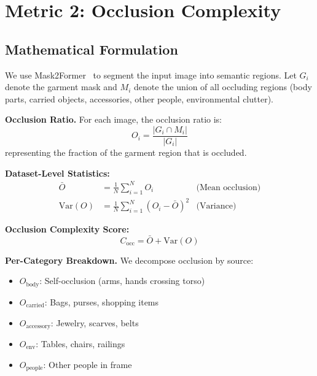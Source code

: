\documentclass[runningheads]{llncs}
\newcommand{\Var}{\mathrm{Var}}
\begin{document}
\section{Metric 2: Occlusion Complexity}
\label{sec:m2_occlusion}

\subsection{Mathematical Formulation}

We use Mask2Former~\cite{cheng2022mask2former} to segment the input image into semantic regions. Let $G_i$ denote the garment mask and $M_i$ denote the union of all occluding regions (body parts, carried objects, accessories, other people, environmental clutter).

\textbf{Occlusion Ratio.} For each image, the occlusion ratio is:
\begin{equation}
    O_i = \frac{|G_i \cap M_i|}{|G_i|}
\end{equation}
representing the fraction of the garment region that is occluded.

\textbf{Dataset-Level Statistics:}
\begin{align}
    \bar{O} &= \frac{1}{N}\sum_{i=1}^{N} O_i & \text{(Mean occlusion)} \\
    \Var(O) &= \frac{1}{N}\sum_{i=1}^{N} (O_i - \bar{O})^2 & \text{(Variance)}
\end{align}

\textbf{Occlusion Complexity Score:}
\begin{equation}
    C_{\text{occ}} = \bar{O} + \Var(O)
\end{equation}

\textbf{Per-Category Breakdown.} We decompose occlusion by source:
\begin{itemize}
    \item $O_{\text{body}}$: Self-occlusion (arms, hands crossing torso)
    \item $O_{\text{carried}}$: Bags, purses, shopping items
    \item $O_{\text{accessory}}$: Jewelry, scarves, belts
    \item $O_{\text{env}}$: Tables, chairs, railings
    \item $O_{\text{people}}$: Other people in frame
\end{itemize}
\end{document}
